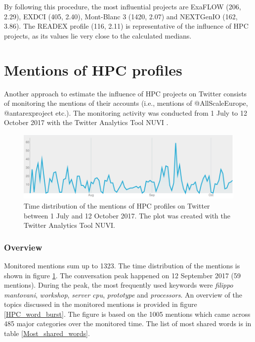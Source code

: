 By following this procedure, the most influential projects are ExaFLOW (206, 2.29), EXDCI (405, 2.40), Mont-Blanc 3 (1420, 2.07) and NEXTGenIO (162, 3.86). The READEX profile (116, 2.11) is representative of the influence of HPC projects, as its values lie very close to the calculated medians.

\section{Mentions of HPC profiles} \label{Mentions_of_HPC_profiles} 
Another approach to estimate the influence of HPC projects on Twitter consists of monitoring the mentions of their accounts (i.e., mentions of @AllScaleEurope, @antarex\textunderscore project etc.). The monitoring activity was conducted from 1 July to 12 October 2017 with the Twitter Analytics Tool NUVI \cite{NUVI}.  

\begin{figure}[!t] 
 \begin{center}
 \includegraphics[scale=0.4]{Images/NUVI_time_distribution.png}
 \caption{Time distribution of the mentions of HPC profiles on Twitter between 1 July and 12 October 2017. The plot was created with the Twitter Analytics Tool NUVI.}
 \label{NUVI_time_distribution}
 \end{center}
\end{figure}

\subsubsection{Overview}
Monitored mentions sum up to 1323. The time distribution of the mentions is shown in figure \ref{NUVI_time_distribution}. The conversation peak happened on 12 September 2017 (59 mentions). During the peak, the most frequently used keywords were \textit{filippo mantovani}, \textit{workshop}, \textit{server cpu}, \textit{prototype} and \textit{processors}. An overview of the topics discussed in the monitored mentions is provided in figure \ref{HPC_word_burst}. The figure is based on the 1005 mentions which came across 485 major categories over the monitored time. The list of most shared words is in table \ref{Most_shared_words}.

